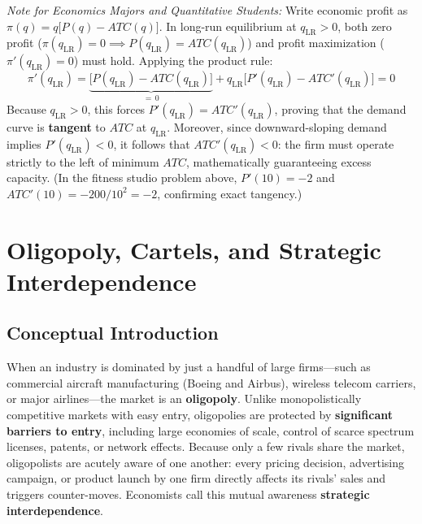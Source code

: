 \documentclass[11pt,letterpaper]{article}
\begin{document}
\begin{tcolorbox}[colback=LightSlate,colframe=CourseBlue,title=\textbf{Optional Advanced Section: Proving Tangency and Excess Capacity}]
\small
\emph{Note for Economics Majors and Quantitative Students:}
Write economic profit as $\pi(q) = q\bigl[P(q) - ATC(q)\bigr]$. In long-run equilibrium at $q_{\text{LR}} > 0$, both zero profit ($\pi(q_{\text{LR}}) = 0 \implies P(q_{\text{LR}}) = ATC(q_{\text{LR}})$) and profit maximization ($\pi'(q_{\text{LR}}) = 0$) must hold. Applying the product rule:
\[
\pi'(q_{\text{LR}}) = \underbrace{\bigl[P(q_{\text{LR}}) - ATC(q_{\text{LR}})\bigr]}_{=\,0} + q_{\text{LR}}\bigl[P'(q_{\text{LR}}) - ATC'(q_{\text{LR}})\bigr] = 0
\]
Because $q_{\text{LR}} > 0$, this forces $P'(q_{\text{LR}}) = ATC'(q_{\text{LR}})$, proving that the demand curve is \textbf{tangent} to $ATC$ at $q_{\text{LR}}$. Moreover, since downward-sloping demand implies $P'(q_{\text{LR}}) < 0$, it follows that $ATC'(q_{\text{LR}}) < 0$: the firm must operate strictly to the left of minimum $ATC$, mathematically guaranteeing excess capacity. (In the fitness studio problem above, $P'(10) = -2$ and $ATC'(10) = -200/10^2 = -2$, confirming exact tangency.)
\end{tcolorbox}

\section{Oligopoly, Cartels, and Strategic Interdependence}

\subsection*{Conceptual Introduction}
When an industry is dominated by just a handful of large firms—such as commercial aircraft manufacturing (Boeing and Airbus), wireless telecom carriers, or major airlines—the market is an \textbf{oligopoly}. Unlike monopolistically competitive markets with easy entry, oligopolies are protected by \textbf{significant barriers to entry}, including large economies of scale, control of scarce spectrum licenses, patents, or network effects. Because only a few rivals share the market, oligopolists are acutely aware of one another: every pricing decision, advertising campaign, or product launch by one firm directly affects its rivals' sales and triggers counter-moves. Economists call this mutual awareness \textbf{strategic interdependence}.
\end{document}
